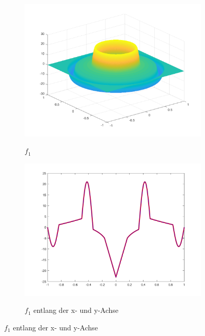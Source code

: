 \begin{figure}[p]
  \centering
  \begin{subfigure}[b]{.48\linewidth}
    \centering
    \caption{$f_1$}
    \includegraphics[trim = 40 30 30 30, clip, width=\linewidth]
      {pictures/chapExperiments/secGeneralInfo/f01Plots/inSi1.png}
    \label{fig:f01InSi}
  \end{subfigure}
  \quad
  \begin{subfigure}[b]{.48\linewidth}
    \centering
    \caption{$f_1$ entlang der x- und y-Achse}
    \includegraphics[trim = 50 30 50 20, clip, width=\linewidth]
      {pictures/chapExperiments/secGeneralInfo/f01Plots/inSi1Axis.png}
    \label{fig:f01InSiAxis}
  \end{subfigure}


\end{figure}
